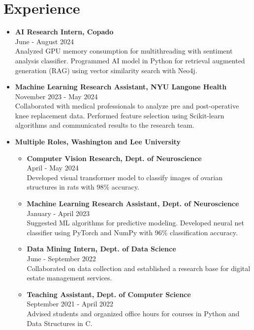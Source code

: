 \section*{Experience}
\begin{itemize}[leftmargin=*]
    \item \textbf{AI Research Intern, Copado} \\
    June - August 2024 \\
    Analyzed GPU memory consumption for multithreading with sentiment analysis classifier. Programmed AI model in Python for retrieval augmented generation (RAG) using vector similarity search with Neo4j.

    \item \textbf{Machine Learning Research Assistant, NYU Langone Health} \\
    November 2023 - May 2024 \\
    Collaborated with medical professionals to analyze pre and post-operative knee replacement data. Performed feature selection using Scikit-learn algorithms and communicated results to the research team.

    \item \textbf{Multiple Roles, Washington and Lee University}
    \begin{itemize}
        \item \textbf{Computer Vision Research, Dept. of Neuroscience} \\
        April - May 2024 \\
        Developed visual transformer model to classify images of ovarian structures in rats with 98\% accuracy.
        
        \item \textbf{Machine Learning Research Assistant, Dept. of Neuroscience} \\
        January - April 2023 \\
        Suggested ML algorithms for predictive modeling. Developed neural net classifier using PyTorch and NumPy with 96\% classification accuracy.
        
        \item \textbf{Data Mining Intern, Dept. of Data Science} \\
        June - September 2022 \\
        Collaborated on data collection and established a research base for digital estate management services.
        
        \item \textbf{Teaching Assistant, Dept. of Computer Science} \\
        September 2021 - April 2022 \\
        Advised students and organized office hours for courses in Python and Data Structures in C.
    \end{itemize}
\end{itemize}
